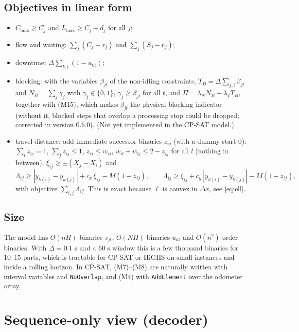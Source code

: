 \documentclass[11pt,a4paper]{article}
\theoremstyle{definition}
\theoremstyle{remark}
\begin{document}
\subsection{Objectives in linear form}
\begin{itemize}[nosep]
\item $C_{\max}\ge C_j$ and $L_{\max}\ge C_j-d_j$ for all $j$;
\item flow and waiting: $\sum_j(C_j-r_j)$ and $\sum_j(S_j-r_j)$;
\item downtime: $\Delta\sum_{k,t}(1-u_{kt})$;
\item blocking: with the variables $\beta_{jt}$ of the non-idling constraints,
$T_B=\Delta\sum_{j,t}\beta_{jt}$ and $N_B=\sum_j\gamma_j$ with $\gamma_j\in\{0,1\}$,
$\gamma_j\ge\beta_{jt}$ for all $t$, and $\Pi=\lambda_N N_B+\lambda_T T_B$, together with
(M15), which makes $\beta_{jt}$ the physical blocking indicator (without it, blocked steps
that overlap a processing stop could be dropped; corrected in version 0.6.0). (Not yet
implemented in the CP-SAT model.)
\item travel distance: add immediate-successor binaries $z_{ij}$ (with a dummy start
$0$): $\sum_i z_{ij}=1$, $\sum_j z_{ij}\le 1$, $z_{ij}\le w_{ij}$,
$w_{il}+w_{lj}\le 2-z_{ij}$ for all $l$ (nothing in between), $\xi_{ij}\ge\pm(X_j-X_i)$ and
\[
\Lambda_{ij}\ge |y_{k(i)}-y_{k(j)}|+c_x\,\xi_{ij}-M(1-z_{ij}),\qquad
\Lambda_{ij}\ge \xi_{ij}+c_y\,|y_{k(i)}-y_{k(j)}|-M(1-z_{ij}),
\]
with objective $\sum_{i,j}\Lambda_{ij}$. This is exact because $\ell$ is convex in
$\Delta x$, see \eqref{eq:ell}.
\end{itemize}

\subsection{Size}
The model has $O(nH)$ binaries $s_{jt}$, $O(NH)$ binaries $u_{kt}$ and $O(n^2)$ order
binaries. With $\Delta=0.1$ s and a $60$ s window this is a few thousand binaries for
10--15 parts, which is tractable for CP-SAT or HiGHS on small instances and inside a
rolling horizon. In CP-SAT, (M7)--(M8) are naturally written with interval variables
and \texttt{NoOverlap}, and (M4) with \texttt{AddElement} over the odometer array.

\section{Sequence-only view (decoder)}
\end{document}
